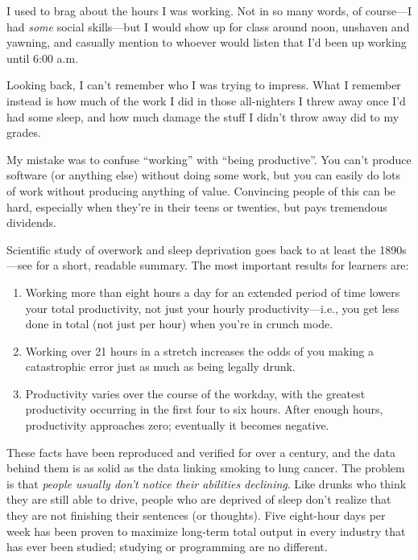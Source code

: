 
I used to brag about the hours I was working.
Not in so many words,
of course---I had \emph{some} social skills---but
I would show up for class around noon,
unshaven and yawning,
and casually mention to whoever would listen
that I'd been up working until 6:00 a.m.

Looking back,
I can't remember who I was trying to impress.
What I remember instead is
how much of the work I did in those all-nighters I threw away once I'd had some sleep,
and how much damage the stuff I didn't throw away did to my grades.

My mistake was to confuse ``working'' with ``being productive''.
You can't produce software (or anything else) without doing some work,
but you can easily do lots of work without producing anything of value.
Convincing people of this can be hard,
especially when they're in their teens or twenties,
but pays tremendous dividends.

Scientific study of overwork and sleep deprivation goes back to at least the 1890s---see
\cite{Robi2005} for a short, readable summary.
The most important results for learners are:

\begin{enumerate}

\item
  Working more than eight hours a day for an extended period of time
  lowers your total productivity,
  not just your hourly productivity---i.e.,
  you get less done in total (not just per hour)
  when you're in crunch mode.

\item
  Working over 21 hours in a stretch increases the odds of you making a catastrophic error
  just as much as being legally drunk.

\item
  Productivity varies over the course of the workday,
  with the greatest productivity occurring in the first four to six hours.
  After enough hours,
  productivity approaches zero;
  eventually it becomes negative.

\end{enumerate}

These facts have been reproduced and verified for over a century,
and the data behind them is as solid as the data linking smoking to lung cancer.
The problem is that
\emph{people usually don't notice their abilities declining}.
Like drunks who think they are still able to drive,
people who are deprived of sleep don't realize that
they are not finishing their sentences (or thoughts).
Five eight-hour days per week has been proven to maximize long-term total output
in every industry that has ever been studied;
studying or programming are no different.

